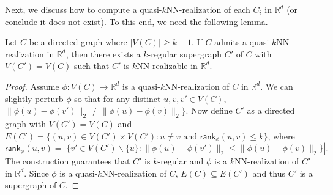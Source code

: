 \documentclass[english]{lipics-v2021}
\begin{document}
Next, we discuss how to compute a quasi-$k$NN-realization of each $C_i$ in $\mathbb{R}^d$ (or conclude it does not exist).
To this end, we need the following lemma.

\begin{lemma}
Let $C$ be a directed graph where $|V(C)| \geq k+1$.
If $C$ admits a quasi-$k$NN-realization in $\mathbb{R}^d$, then there exists a $k$-regular supergraph $C'$ of $C$ with $V(C') = V(C)$ such that $C'$ is $k$NN-realizable in $\mathbb{R}^d$.
\end{lemma}
\begin{proof}
Assume $\phi: V(C) \rightarrow \mathbb{R}^d$ is a quasi-$k$NN-realization of $C$ in $\mathbb{R}^d$.
We can slightly perturb $\phi$ so that for any distinct $u,v,v' \in V(C)$, $\lVert \phi(u) - \phi(v') \rVert_2 \neq \lVert \phi(u) - \phi(v) \rVert_2\}$.
Now define $C'$ as a directed graph with $V(C') = V(C)$ and $E(C') = \{(u,v) \in V(C') \times V(C'): u \neq v \text{ and } \mathsf{rank}_\phi(u,v) \leq k\}$, where 
\begin{equation*}
    \mathsf{rank}_\phi(u,v) = |\{v' \in V(C') \backslash \{u\}: \lVert \phi(u) - \phi(v') \rVert_2 \leq \lVert \phi(u) - \phi(v) \rVert_2\}|.
\end{equation*}
The construction guarantees that $C'$ is $k$-regular and $\phi$ is a $k$NN-realization of $C'$ in $\mathbb{R}^d$.
Since $\phi$ is a quasi-$k$NN-realization of $C$, $E(C) \subseteq E(C')$ and thus $C'$ is a supergraph of $C$.
\end{proof}
\end{document}
